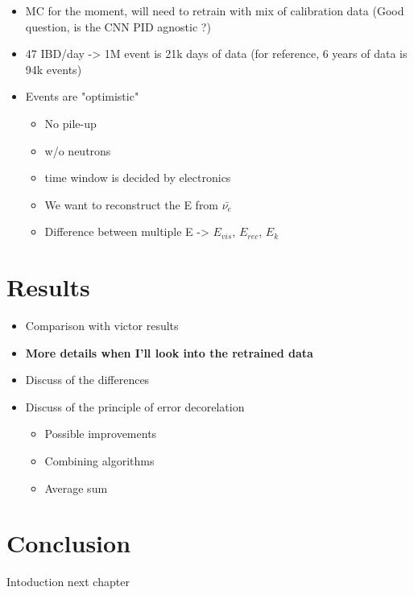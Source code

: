 \begin{itemize}
\begin{itemize}
\begin{itemize}
          \item MC for the moment, will need to retrain with mix of calibration data (Good question, is the CNN PID agnostic ?)
          \item 47 IBD/day -> 1M event is 21k days of data (for reference, 6 years of data is 94k events)
          \item Events are "optimistic"
            \begin{itemize}
              \item No pile-up
              \item w/o neutrons
              \item time window is decided by electronics
              \item We want to reconstruct the E from $\bar{\nu_e}$
              \item Difference between multiple E -> $E_{vis}$, $E_{rec}$, $E_k$
            \end{itemize}
        \end{itemize}
    \end{itemize}
\end{itemize}

\section{Results}

\begin{itemize}
  \item Comparison with victor results
  \item \textbf{More details when I'll look into the retrained data}
  \item Discuss of the differences
  \item Discuss of the principle of error decorelation
    \begin{itemize}
      \item Possible improvements
      \item Combining algorithms
      \item Average sum
    \end{itemize}
\end{itemize}

\section{Conclusion}
Intoduction next chapter
